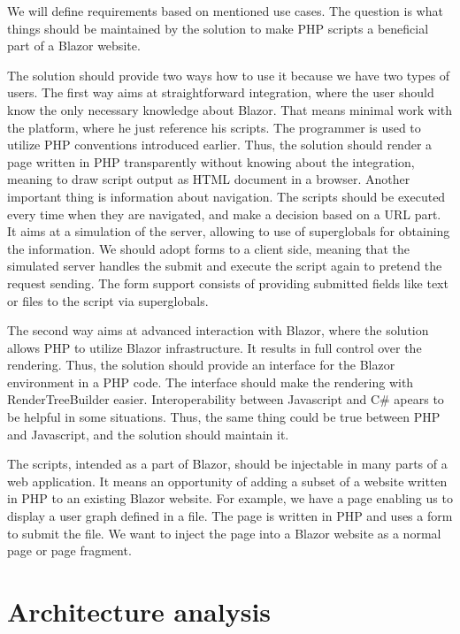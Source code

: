 We will define requirements based on mentioned use cases.
The question is what things should be maintained by the solution to make PHP scripts a beneficial part of a Blazor website.
\par
The solution should provide two ways how to use it because we have two types of users.
The first way aims at straightforward integration, where the user should know the only necessary knowledge about Blazor.
That means minimal work with the platform, where he just reference his scripts.
The programmer is used to utilize PHP conventions introduced earlier. 
Thus, the solution should render a page written in PHP transparently without knowing about the integration, meaning to draw script output as HTML document in a browser.
Another important thing is information about navigation.
The scripts should be executed every time when they are navigated, and make a decision based on a URL part.
It aims at a simulation of the server, allowing to use of superglobals for obtaining the information.
We should adopt forms to a client side, meaning that the simulated server handles the submit and execute the script again to pretend the request sending.
The form support consists of providing submitted fields like text or files to the script via superglobals.
\par
The second way aims at advanced interaction with Blazor, where the solution allows PHP to utilize Blazor infrastructure.
It results in full control over the rendering.
Thus, the solution should provide an interface for the Blazor environment in a PHP code.
The interface should make the rendering with RenderTreeBuilder easier.
Interoperability between Javascript and C\# apears to be helpful in some situations. 
Thus, the same thing could be true between PHP and Javascript, and the solution should maintain it.
\par
The scripts, intended as a part of Blazor, should be injectable in many parts of a web application.
It means an opportunity of adding a subset of a website written in PHP to an existing Blazor website.
For example, we have a page enabling us to display a user graph defined in a file.
The page is written in PHP and uses a form to submit the file.
We want to inject the page into a Blazor website as a normal page or page fragment.

\section{Architecture analysis}

